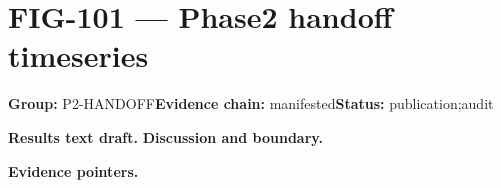 \clearpage
\section{FIG-101 --- Phase2 handoff timeseries}
\label{figpage:fig-101}
\textbf{Group:} P2-HANDOFF\quad \textbf{Evidence chain:} manifested\quad \textbf{Status:} publication;audit

\textbf{Results text draft.} 
\textbf{Discussion and boundary.} 


\textbf{Evidence pointers.}



\vfill
